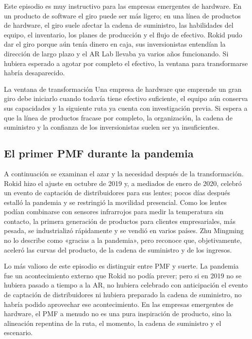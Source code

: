 Este episodio es muy instructivo para las empresas emergentes de hardware. En un producto de software el giro puede ser más ligero; en una línea de productos de hardware, el giro suele afectar la cadena de suministro, las habilidades del equipo, el inventario, los planes de producción y el flujo de efectivo. Rokid pudo dar el giro porque aún tenía dinero en caja, sus inversionistas entendían la dirección de largo plazo y el AR Lab llevaba ya varios años funcionando. Si hubiera esperado a agotar por completo el efectivo, la ventana para transformarse habría desaparecido.

\begin{importantbox}{La ventana de transformación}
Una empresa de hardware que emprende un gran giro debe iniciarlo cuando todavía tiene efectivo suficiente, el equipo aún conserva sus capacidades y la siguiente ruta ya cuenta con investigación previa. Si espera a que la línea de productos fracase por completo, la organización, la cadena de suministro y la confianza de los inversionistas suelen ser ya insuficientes.
\end{importantbox}

\subsection{El primer PMF durante la pandemia}

A continuación se examinan el azar y la necesidad después de la transformación. Rokid hizo el ajuste en octubre de 2019 y, a mediados de enero de 2020, celebró un evento de captación de distribuidores para sus lentes; pocos días después estalló la pandemia y se restringió la movilidad presencial. Como los lentes podían combinarse con sensores infrarrojos para medir la temperatura sin contacto, la primera generación de productos para clientes empresariales, más pesada, se industrializó rápidamente y se vendió en varios países. Zhu Mingming no lo describe como «gracias a la pandemia», pero reconoce que, objetivamente, aceleró las curvas del producto, de la cadena de suministro y de los ingresos.

Lo más valioso de este episodio es distinguir entre PMF y suerte. La pandemia fue un acontecimiento externo que Rokid no podía prever; pero si en 2019 no se hubiera pasado a tiempo a la AR, no hubiera celebrado con anticipación el evento de captación de distribuidores ni hubiera preparado la cadena de suministro, no habría podido aprovechar ese acontecimiento. En las empresas emergentes de hardware, el PMF a menudo no es una pura inspiración de producto, sino la alineación repentina de la ruta, el momento, la cadena de suministro y el escenario.

